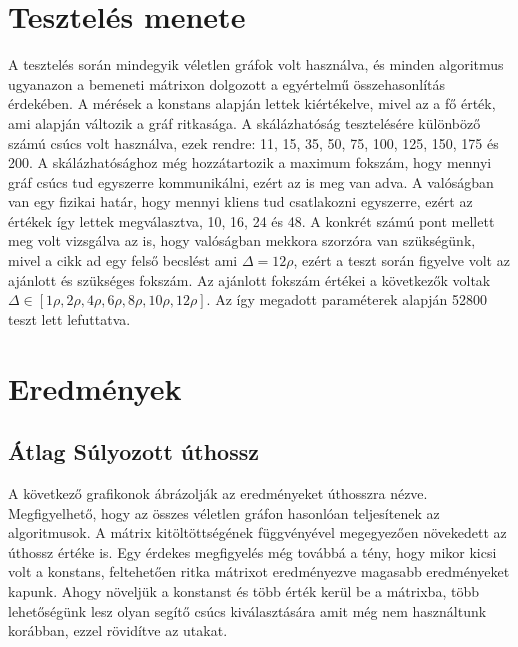 \documentclass[12pt]{report}
\begin{document}
\section{Tesztelés menete}

A tesztelés során mindegyik véletlen gráfok volt használva, és minden algoritmus ugyanazon a bemeneti mátrixon dolgozott a egyértelmű összehasonlítás érdekében. 
A mérések a konstans alapján lettek kiértékelve, mivel az a fő érték, ami alapján változik a gráf ritkasága.
A skálázhatóság tesztelésére különböző számú csúcs volt használva, ezek rendre: 11, 15, 35, 50, 75, 100, 125, 150, 175 és 200.
A skálázhatósághoz még hozzátartozik a maximum fokszám, hogy mennyi gráf csúcs tud egyszerre kommunikálni, ezért az is meg van adva.
A valóságban van egy fizikai határ, hogy mennyi kliens tud csatlakozni egyszerre, ezért az értékek így lettek megválasztva, 10, 16, 24 és 48.
A konkrét számú pont mellett meg volt vizsgálva az is, hogy valóságban mekkora szorzóra van szükségünk, mivel a cikk ad egy felső becslést ami $\Delta=12\rho$, ezért a teszt során figyelve volt az ajánlott és szükséges fokszám.
Az ajánlott fokszám értékei a következők voltak $\Delta\in[1\rho, 2\rho, 4\rho, 6\rho, 8\rho, 10\rho, 12\rho]$.
Az így megadott paraméterek alapján 52800 teszt lett lefuttatva.


\section{Eredmények}

\subsection{Átlag Súlyozott úthossz}

A következő grafikonok ábrázolják az eredményeket úthosszra nézve. 
Megfigyelhető, hogy az összes véletlen gráfon hasonlóan teljesítenek az algoritmusok.
A mátrix kitöltöttségének függvényével megegyezően növekedett az úthossz értéke is.
Egy érdekes megfigyelés még továbbá a tény, hogy mikor kicsi volt a konstans, feltehetően ritka mátrixot eredményezve magasabb eredményeket kapunk.
Ahogy növeljük a konstanst és több érték kerül be a mátrixba, több lehetőségünk lesz olyan segítő csúcs kiválasztására amit még nem használtunk korábban, ezzel rövidítve az utakat.
\end{document}
